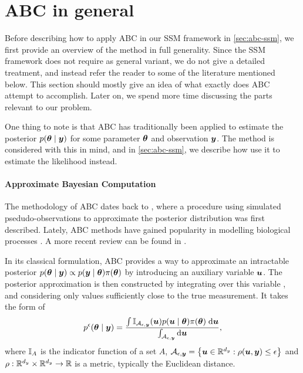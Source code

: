 \section{ABC in general} \label{sec:abc-general}
Before describing how to apply ABC in our SSM framework in \autoref{sec:abc-ssm}, we first provide an overview of the method in full generality. Since the SSM framework does not require as general variant, we do not give a detailed treatment, and instead refer the reader to some of the literature mentioned below. This section should mostly give an idea of what exactly does ABC attempt to accomplish. Later on, we spend more time discussing the parts relevant to our problem.

One thing to note is that ABC has traditionally been applied to estimate the posterior $p(\bm{\theta} \mid \bm{y})$ for some parameter $\bm{\theta}$ and observation $\bm{y}$. The method is considered with this in mind, and in \autoref{sec:abc-ssm}, we describe how use it to estimate the likelihood instead.

\paragraph{Approximate Bayesian Computation}
The methodology of ABC dates back to \cite{abc-old-old}, where a procedure using simulated psedudo-observations to approximate the posterior distribution was first described. Lately, ABC methods have gained popularity in modelling biological processes \citep{abc-old}. A more recent review can be found in \cite{abc-recent}.

In its classical formulation, ABC provides a way to approximate an intractable posterior $p(\bm{\theta} \mid \bm{y}) \propto p(\bm{y} \mid \bm{\theta}) \pi(\bm{\theta})$ by introducing an auxiliary variable $\bm{u}$. The posterior approximation is then constructed by integrating over this variable \citep{jasra-filtering}, and considering only values sufficiently close to the true measurement. It takes the form of
\begin{equation} \label{eq:abc-integral}
p^\epsilon(\bm{\theta} \mid \bm{y}) = \frac{\int \mathbb{I}_{\mathcal{A}_{\epsilon, \bm{y}}}(\bm{u}) p(\bm{u} \mid \bm{\theta}) \pi(\bm{\theta}) \; \mathrm{d}{\bm{u}}}{\int_{\mathcal{A}_{\epsilon, \bm{y}}} \mathrm{d}{\bm{u}}},
\end{equation}
where $\mathbb{I}_A$ is the indicator function of a set $A$, $\mathcal{A}_{\epsilon, \bm{y}} = \left\{\bm{u} \in \mathbb{R}^{d_y} : \rho(\bm{u}, \bm{y}) \leq \epsilon \right\}$ and $\rho: \mathbb{R}^{d_y} \times \mathbb{R}^{d_y} \to \mathbb{R}$ is a metric, typically the Euclidean distance.

